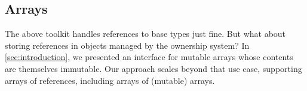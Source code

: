 \documentclass[acmsmall,usenames,dvipsnames,natbib=false,acmthm=false,screen]{acmart}
\theoremstyle{acmplain}
\theoremstyle{acmdefinition}
\begin{document}

\subsection{Arrays}
\label{sec:arrays}

The above toolkit handles references to base types just fine.  But
what about storing references in objects managed by the ownership
system? In \cref{sec:introduction}, we presented an interface for mutable
arrays whose contents are themselves immutable. Our approach
scales beyond that use case, supporting arrays of
references, including arrays of (mutable) arrays.

\end{document}
